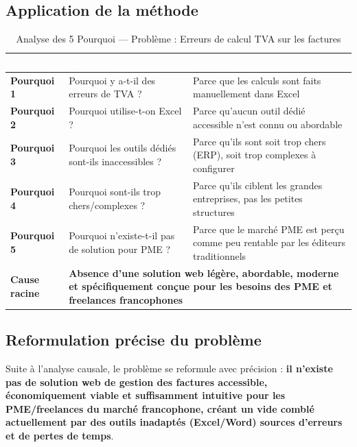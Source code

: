 \documentclass[12pt,a4paper]{report}
\begin{document}
\subsection{Application de la méthode}

\begin{table}[H]
\centering
\caption{Analyse des 5 Pourquoi — Problème : Erreurs de calcul TVA sur les factures}
\label{tab:5pourquoi}
\begin{tabularx}{\textwidth}{|l|X|X|}
\hline
\rowcolor{emsiblue}\textcolor{white}{\textbf{Niveau}} & \textcolor{white}{\textbf{Question}} & \textcolor{white}{\textbf{Réponse}} \\
\hline
\textbf{Pourquoi 1} & Pourquoi y a-t-il des erreurs de TVA ? & Parce que les calculs sont faits manuellement dans Excel \\
\textbf{Pourquoi 2} & Pourquoi utilise-t-on Excel ? & Parce qu'aucun outil dédié accessible n'est connu ou abordable \\
\textbf{Pourquoi 3} & Pourquoi les outils dédiés sont-ils inaccessibles ? & Parce qu'ils sont soit trop chers (ERP), soit trop complexes à configurer \\
\textbf{Pourquoi 4} & Pourquoi sont-ils trop chers/complexes ? & Parce qu'ils ciblent les grandes entreprises, pas les petites structures \\
\textbf{Pourquoi 5} & Pourquoi n'existe-t-il pas de solution pour PME ? & Parce que le marché PME est perçu comme peu rentable par les éditeurs traditionnels \\
\hline
\rowcolor{lightblue}\textbf{Cause racine} & \multicolumn{2}{X|}{\textbf{Absence d'une solution web légère, abordable, moderne et spécifiquement conçue pour les besoins des PME et freelances francophones}} \\
\hline
\end{tabularx}
\end{table}

\subsection{Reformulation précise du problème}

Suite à l'analyse causale, le problème se reformule avec précision : \textbf{il n'existe pas de solution web de gestion des factures accessible, économiquement viable et suffisamment intuitive pour les PME/freelances du marché francophone, créant un vide comblé actuellement par des outils inadaptés (Excel/Word) sources d'erreurs et de pertes de temps}.
\end{document}
